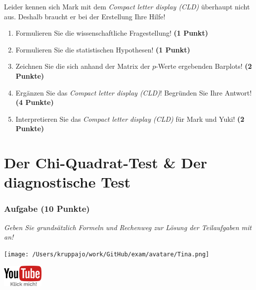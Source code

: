 \documentclass[a4paper, 9pt]{scrartcl}\usepackage[]{graphicx}\usepackage[]{xcolor}
\begin{document}
Leider kennen sich Mark mit dem \textit{Compact letter display (CLD)} überhaupt nicht aus. Deshalb braucht er bei der Erstellung Ihre Hilfe!

\begin{enumerate}
  \item Formulieren Sie die wissenschaftliche Fragestellung! \textbf{(1 Punkt)}
  \item Formulieren Sie die statistischen Hypothesen! \textbf{(1 Punkt)}
\item Zeichnen Sie die sich anhand der Matrix der $p$-Werte ergebenden Barplots! \textbf{(2 Punkte)}
\item Ergänzen Sie das \textit{Compact letter display (CLD)}! Begründen Sie Ihre Antwort! \textbf{(4 Punkte)}
\item Interpretieren Sie das \textit{Compact letter display (CLD)} für Mark und Yuki! \textbf{(2 Punkte)} 
\end{enumerate}

 
\clearpage
\part{Der Chi-Quadrat-Test \& Der diagnostische Test}

\section{Aufgabe \hfill (10 Punkte)}

\textit{Geben Sie grundsätzlich Formeln und Rechenweg zur Lösung der Teilaufgaben mit an!} \\[1Ex]
 

 
\begin{minipage}[t]{0.5\textwidth}
\texttt{[image: /Users/kruppajo/work/GitHub/exam/avatare/Tina.png]}
\end{minipage}
\begin{minipage}[t]{0.5\textwidth}
\hfill
\href{https://youtu.be/-Kva5wc5Elw}{\includegraphics[width = 2cm]{img/youtube}}
\end{minipage}
\vspace{-3Ex}
\end{document}
